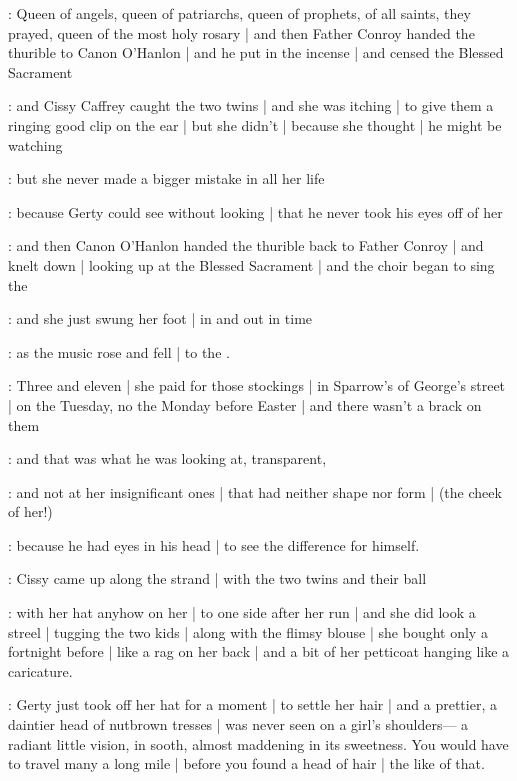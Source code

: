 \Nrelig:
Queen of angels,
queen of patriarchs,
queen of prophets,
of all saints,
they prayed,
queen of the most holy rosary |%
and then Father Conroy
handed the thurible
to Canon O'Hanlon |
and he put in the incense |
and censed the Blessed Sacrament

:
and Cissy Caffrey caught the two twins |
and she was itching |
to give them a ringing good clip on the ear |
but she didn't |
because she thought |
he might be watching

\gertyJudgy:
but she never made a bigger mistake in all her life

\gertySex:
because Gerty could see without looking |
that he never took his eyes off of her

\Nrelig:
and then Canon O'Hanlon
handed the thurible
back to Father Conroy |
and knelt down |
looking up at the Blessed Sacrament |
and the choir
began to sing the 

\gertySex:
and she just swung her foot |
in and out in time

\Nrelig:
as the music rose and fell |
to the .

\gertyReal:
Three and eleven |
she paid for those stockings |%
in Sparrow's of George's street |
on the Tuesday,
no the Monday before Easter |
and there wasn't a brack on them

\gertySex:
and that was what he was looking at,
transparent,

\gertyJudgy:
and not at her insignificant ones |
that had neither shape nor form |
(the cheek of her!)

\gertySex:
because he had eyes in his head |
to see the difference
for himself.

:
Cissy came up along the strand |
with the two twins
and their ball

\gertyJudgy:
with her hat anyhow on her |
to one side after her run |
and she did look a streel |
tugging the two kids |
along with the flimsy blouse |
she bought only a fortnight before |
like a rag on her back |
and a bit of her petticoat
hanging like a caricature.

\gertyNovel:
Gerty just took off her hat for a moment |
to settle her hair |
and a prettier,
a daintier head of nutbrown tresses |%
was never seen on a girl's shoulders—%
a radiant little vision,
in sooth,
almost maddening
in its sweetness.
You would have to travel
many a long mile |
before you found
a head of hair |
the like of that.

